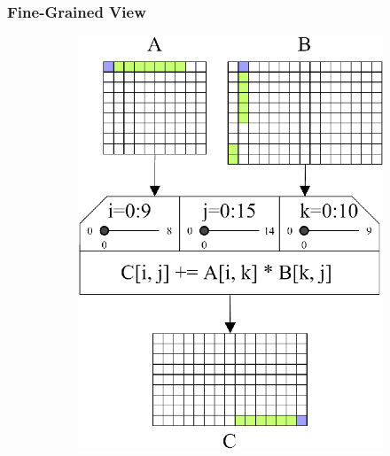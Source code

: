 \subsubsection{Fine-Grained View}\label{sec:fine_view}
\begin{figure}
	\centering
	\begin{subfigure}[c]{.54\linewidth}
		\centering
		\includegraphics[width=\linewidth]{pictures/boosting_cache_lines.png}
	\end{subfigure}
	\begin{subfigure}[c]{.44\linewidth}
		\centering

\end{subfigure}
\end{figure}
